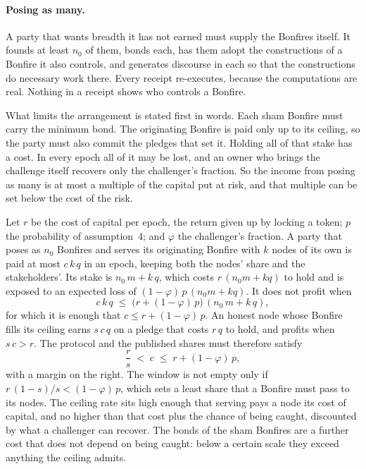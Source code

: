 \paragraph{Posing as many.} A party that wants breadth it has not earned must supply the Bonfires itself. It founds
at least $n_0$ of them, bonds each, has them adopt the constructions of a Bonfire it also controls, and generates
discourse in each so that the constructions do necessary work there. Every receipt re-executes, because the
computations are real. Nothing in a receipt shows who controls a Bonfire.

What limits the arrangement is stated first in words. Each sham Bonfire must carry the minimum bond. The
originating Bonfire is paid only up to its ceiling, so the party must also commit the pledges that set it. Holding
all of that stake has a cost. In every epoch all of it may be lost, and an owner who brings the challenge itself
recovers only the challenger's fraction. So the income from posing as many is at most a multiple of the capital put
at risk, and that multiple can be set below the cost of the risk.

Let $r$ be the cost of capital per epoch, the return given up by locking a token; $p$ the probability of
assumption~4; and $\varphi$ the challenger's fraction. A party that poses as $n_0$ Bonfires and serves its
originating Bonfire with $k$ nodes of its own is paid at most $c\,k\,q$ in an epoch, keeping both the nodes' share
and the stakeholders'. Its stake is $n_0\,m + k\,q$, which costs $r\,(n_0 m + k q)$ to hold and is exposed to an
expected loss of $(1-\varphi)\,p\,(n_0 m + k q)$. It does not profit when
\[
  c\,k\,q \;\le\; \bigl(r + (1-\varphi)\,p\bigr)\,(n_0\,m + k\,q),
\]
for which it is enough that $c \le r + (1-\varphi)\,p$. An honest node whose Bonfire fills its ceiling earns
$s\,c\,q$ on a pledge that costs $r\,q$ to hold, and profits when $s\,c > r$. The protocol and the published shares
must therefore satisfy
\begin{equation}\label{eq:ring}
  \frac{r}{s} \;<\; c \;\le\; r + (1-\varphi)\,p ,
\end{equation}
with a margin on the right. The window is not empty only if $r\,(1-s)/s < (1-\varphi)\,p$, which sets a least
share that a Bonfire must pass to its nodes. The ceiling rate sits high enough that serving pays a node its cost of capital, and no
higher than that cost plus the chance of being caught, discounted by what a challenger can recover. The bonds of
the sham Bonfires are a further cost that does not depend on being caught: below a certain scale they exceed
anything the ceiling admits.

